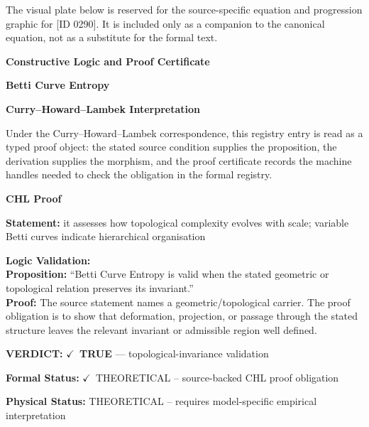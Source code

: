 \begingroup\footnotesize\sloppy
The visual plate below is reserved for the source-specific equation and progression graphic for [ID 0290]. It is included only as a companion to the canonical equation, not as a substitute for the formal text.
\par\endgroup
\ifTZPDarkEdition
{}
\fi

\clearpage
\begingroup\tzpsupportsetup
\noindent\textbf{\fontsize{10.8pt}{12.8pt}\selectfont [ID 0290] Constructive Logic and Proof Certificate}\par
\noindent\textbf{\fontsize{10pt}{12pt}\selectfont Betti Curve Entropy}\par
\vspace{0.45em}
\begingroup
\footnotesize
\setlength{\parskip}{0.22em}
\setlength{\parindent}{0pt}
\noindent\textbf{Curry--Howard--Lambek Interpretation}\par
Under the Curry--Howard--Lambek correspondence, this registry entry is read as a typed proof
object: the stated source condition supplies the proposition, the derivation supplies the
morphism, and the proof certificate records the machine handles needed to check the obligation
in the formal registry.

\vspace{0.45em}
\noindent\textbf{CHL Proof}\par
\textbf{Statement:} it assesses how topological complexity evolves with scale; variable Betti curves
indicate hierarchical organisation

\textbf{Logic Validation:}\\
\textbf{Proposition:} ``Betti Curve Entropy is valid when the stated geometric or topological relation preserves
its invariant.''\\
\textbf{Proof:} The source statement names a geometric/topological carrier. The proof obligation is to
show that deformation, projection, or passage through the stated structure leaves the
relevant invariant or admissible region well defined.

\textbf{VERDICT:} \ensuremath{\checkmark}\ \textbf{TRUE} --- topological-invariance validation

\textbf{Formal Status:} \ensuremath{\checkmark}\ THEORETICAL -- source-backed CHL proof obligation

\textbf{Physical Status:} THEORETICAL -- requires model-specific empirical interpretation
\par\vspace{0.45em}
\par
\ifTZPDarkEdition
{}
\fi
\endgroup
\endgroup
